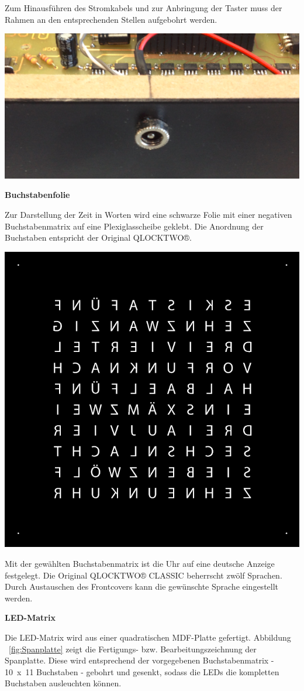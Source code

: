 \begin{multicols}{2}
{}
Zum Hinausführen des Stromkabels und zur Anbringung der Taster muss der Rahmen an den entsprechenden Stellen aufgebohrt werden.

{
\centering
\includegraphics[width=0.5\columnwidth]{Abbildungen/Konstruktion/Stecker01}

}



\textbf{Buchstabenfolie}

Zur Darstellung der Zeit in Worten wird eine schwarze Folie mit einer negativen Buchstabenmatrix auf eine Plexiglasscheibe geklebt. Die Anordnung der Buchstaben entspricht der Original QLOCKTWO®.

{
\centering
\includegraphics[width=0.75\columnwidth]{Abbildungen/Konstruktion/Buchstaben}

}
Mit der gewählten Buchstabenmatrix ist die Uhr auf eine deutsche Anzeige festgelegt. Die Original QLOCKTWO® CLASSIC beherrscht zwölf Sprachen. Durch Austauschen des Frontcovers kann die gewünschte Sprache eingestellt werden.

\textbf{LED-Matrix}

Die LED-Matrix wird aus einer quadratischen MDF-Platte gefertigt. Abbildung ~\ref{fig:Spanplatte} zeigt die Fertigungs- bzw. Bearbeitungszeichnung der Spanplatte. Diese wird entsprechend der vorgegebenen Buchstabenmatrix -  10~x~11 Buchstaben - gebohrt und gesenkt, sodass die LEDs die kompletten Buchstaben ausleuchten können.


\end{multicols}
